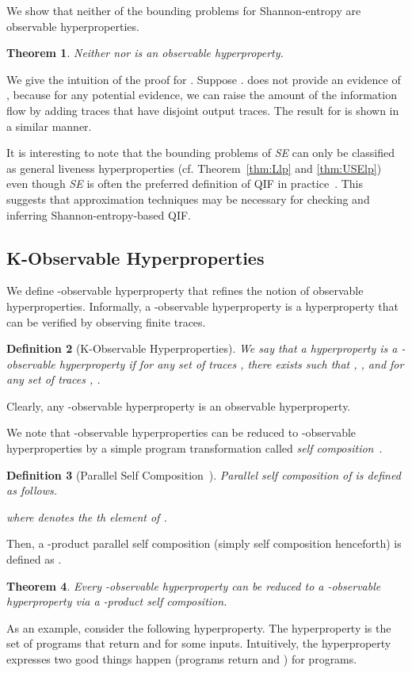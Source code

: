 \documentclass[]{eptcs}
\newtheorem{theorem}{Theorem}[section]
\newtheorem{definition}[theorem]{Definition}
\begin{document}
We show that neither of the bounding problems for Shannon-entropy are
observable hyperproperties.
\begin{theorem}
\label{thm:ULSEnsl}
  Neither  nor  is an
  observable hyperproperty.
\end{theorem}
We give the intuition of the proof for .
Suppose .   does not provide an evidence of
, because for any potential evidence, we can
raise the amount of the information flow by adding traces that have
disjoint output traces.  The result for  is
shown in a similar manner.

It is interesting to note that the bounding problems of {\it SE} can
only be classified as general liveness hyperproperties (cf.
Theorem~\ref{thm:Llp} and \ref{thm:USElp}) even though {\it SE} is
often the preferred definition of QIF in
practice~\cite{denning82,clarkjcs2007,malacaria:popl2007}.  This
suggests that approximation techniques may be necessary for checking
and inferring Shannon-entropy-based QIF.

\subsection{K-Observable Hyperproperties}

We define -observable hyperproperty that refines the notion of
observable hyperproperties.  Informally, a -observable
hyperproperty is a hyperproperty that can be verified by observing 
finite traces.
\begin{definition}[K-Observable Hyperproperties]
  We say that a hyperproperty  is a -observable hyperproperty if
  for any set of traces , there exists  such
  that , , and for any set of traces , .
\end{definition}
Clearly, any -observable hyperproperty is an observable
hyperproperty.

We note that -observable hyperproperties can be reduced to
-observable hyperproperties by a simple program transformation
called {\em self composition}~\cite{barthe:csfw04,darvas:spc05}.
\begin{definition}[Parallel Self
  Composition~\cite{DBLP:journals/jcs/ClarksonS10}]
Parallel self composition of  is defined as follows.

where  denotes the th element of .
\end{definition}
Then, a -product parallel self composition (simply self composition
henceforth) is defined as .
\begin{theorem}
Every -observable hyperproperty can be reduced to a -observable
hyperproperty via a -product self composition.
\end{theorem}
As an example, consider the following hyperproperty.  The
hyperproperty is the set of programs that return  and  for some
inputs.  Intuitively, the hyperproperty expresses two good things
happen (programs return  and ) for programs.
\end{document}
